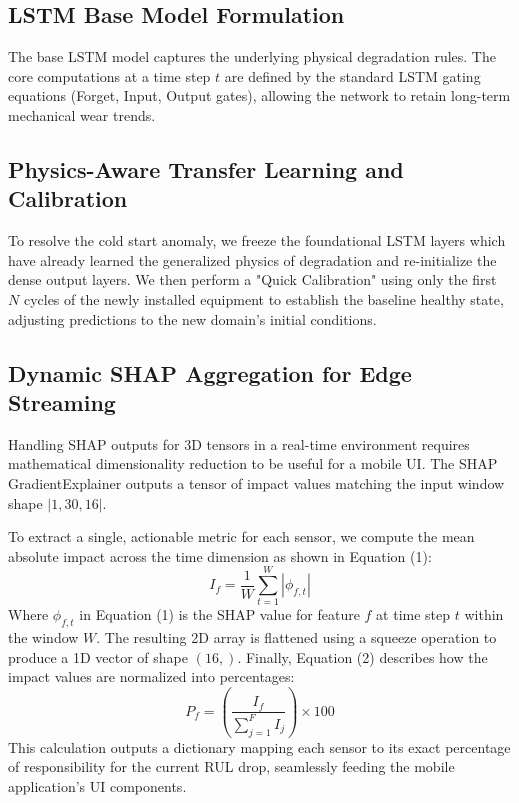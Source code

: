 \documentclass[journal]{IEEEtran}
\begin{document}
\subsection{LSTM Base Model Formulation}
The base LSTM model captures the underlying physical degradation rules. The core computations at a time step $t$ are defined by the standard LSTM gating equations (Forget, Input, Output gates), allowing the network to retain long-term mechanical wear trends.

\subsection{Physics-Aware Transfer Learning and Calibration}
To resolve the cold start anomaly, we freeze the foundational LSTM layers which have already learned the generalized physics of degradation and re-initialize the dense output layers. We then perform a "Quick Calibration" using only the first $N$ cycles of the newly installed equipment to establish the baseline healthy state, adjusting predictions to the new domain's initial conditions.

\subsection{Dynamic SHAP Aggregation for Edge Streaming}
Handling SHAP outputs for 3D tensors in a real-time environment requires mathematical dimensionality reduction to be useful for a mobile UI. The SHAP GradientExplainer outputs a tensor of impact values matching the input window shape $|1,30,16|$. 

To extract a single, actionable metric for each sensor, we compute the mean absolute impact across the time dimension as shown in Equation (1):
\begin{equation}
I_f = \frac{1}{W} \sum_{t=1}^{W} |\phi_{f,t}|
\end{equation}
Where $\phi_{f,t}$ in Equation (1) is the SHAP value for feature $f$ at time step $t$ within the window $W$. The resulting 2D array is flattened using a squeeze operation to produce a 1D vector of shape $(16,)$. Finally, Equation (2) describes how the impact values are normalized into percentages:
\begin{equation}
P_f = \left( \frac{I_f}{\sum_{j=1}^{F} I_j} \right) \times 100
\end{equation}
This calculation outputs a dictionary mapping each sensor to its exact percentage of responsibility for the current RUL drop, seamlessly feeding the mobile application's UI components.
\end{document}
